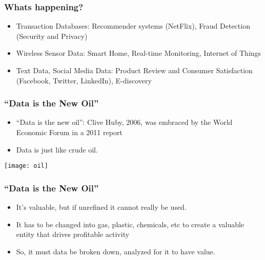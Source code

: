 \begin{frame}[fragile]\frametitle{Whats happening?}
\begin{itemize}
\item Transaction Databases: Recommender systems (NetFlix), Fraud Detection (Security and Privacy)
\item Wireless Sensor Data: Smart Home, Real-time Monitoring, Internet of Things
\item Text Data, Social Media Data: Product Review and Consumer Satisfaction (Facebook, Twitter, LinkedIn), E-discovery
\end{itemize}
\end{frame}

%

\begin{frame}[fragile]\frametitle{``Data is the New Oil''}
\begin{itemize}
\item ``Data is the new oil'': Clive Huby, 2006, was embraced by the World Economic Forum in a 2011 report
\item  Data is just like crude oil. 
\end{itemize}
\begin{center}
\texttt{[image: oil]}
\end{center}
\end{frame}

\begin{frame}[fragile]\frametitle{``Data is the New Oil''}
\begin{itemize}
\item It's valuable, but if unrefined it cannot really be used. 
\item It has to be changed into gas, plastic, chemicals, etc to create a valuable entity that drives profitable activity
\item So, it must data be broken down, analyzed for it to have value.
\end{itemize}
\end{frame}

